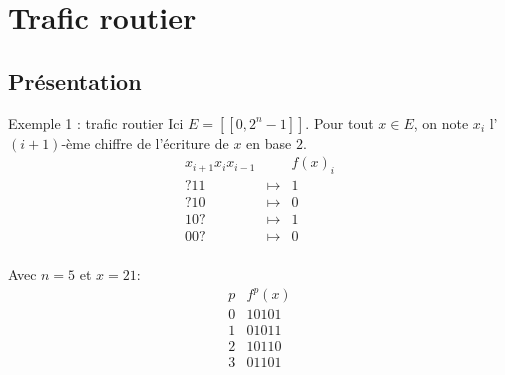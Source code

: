 \section{Trafic routier}
\subsection{Pr\'esentation}
\begin{frame}{Exemple 1 : \og trafic routier \fg{}}
Ici $E = [\![0, 2^{n}-1]\!]$. Pour tout $x\in E$, on note $x_i$ l'$(i+1)$-\`eme chiffre de l'\'ecriture de $x$ en base $2$.
\[\begin{array}{ccc}
x_{\scriptscriptstyle i+1}x_{\scriptscriptstyle i}x_{\scriptscriptstyle i-1} & & f(x)_i\\
?11 & \mapsto & 1\\
?10 & \mapsto & 0\\
10? & \mapsto & 1\\
00? & \mapsto & 0\\
\end{array}\]
\end{frame}

\begin{frame}
Avec $n=5$ et $x=21$:
\[\begin{array}{cc}
p & f^{p}(x)\\
0 & 10101\\
1 & 01011\\
2 & 10110\\
3 & 01101\\
\end{array}\]
\end{frame}

